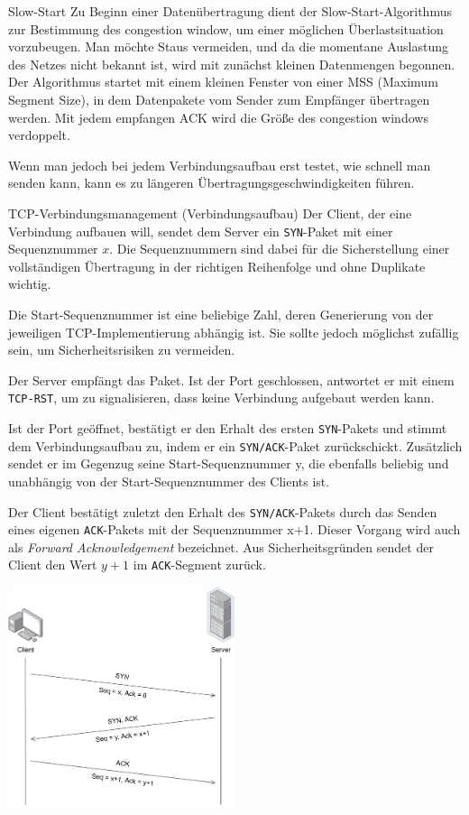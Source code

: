 \begin{bonus}{Slow-Start}
    Zu Beginn einer Datenübertragung dient der Slow-Start-Algorithmus zur Bestimmung des congestion window, um einer möglichen Überlastsituation vorzubeugen.
    Man möchte Staus vermeiden, und da die momentane Auslastung des Netzes nicht bekannt ist, wird mit zunächst kleinen Datenmengen begonnen. Der Algorithmus startet mit einem kleinen Fenster von einer MSS (Maximum Segment Size), in dem Datenpakete vom Sender zum Empfänger übertragen werden.
    Mit jedem empfangen ACK wird die Größe des congestion windows verdoppelt.

    Wenn man jedoch bei jedem Verbindungsaufbau erst testet, wie schnell man senden kann, kann es zu längeren Übertragungsgeschwindigkeiten führen.
\end{bonus}

\begin{defi}{TCP-Verbindungsmanagement (Verbindungsaufbau)}
    Der Client, der eine Verbindung aufbauen will, sendet dem Server ein \texttt{SYN}-Paket mit einer Sequenznummer $x$.
    Die Sequenznummern sind dabei für die Sicherstellung einer vollständigen Übertragung in der richtigen Reihenfolge und ohne Duplikate wichtig.

    Die Start-Sequenznummer ist eine beliebige Zahl, deren Generierung von der jeweiligen TCP-Implementierung abhängig ist.
    Sie sollte jedoch möglichst zufällig sein, um Sicherheitsrisiken zu vermeiden.

    Der Server empfängt das Paket. Ist der Port geschlossen, antwortet er mit einem \texttt{TCP-RST}, um zu signalisieren, dass keine Verbindung aufgebaut werden kann.

    Ist der Port geöffnet, bestätigt er den Erhalt des ersten \texttt{SYN}-Pakets und stimmt dem Verbindungsaufbau zu, indem er ein \texttt{SYN/ACK}-Paket zurückschickt.
    Zusätzlich sendet er im Gegenzug seine Start-Sequenznummer y, die ebenfalls beliebig und unabhängig von der Start-Sequenznummer des Clients ist.

    Der Client bestätigt zuletzt den Erhalt des \texttt{SYN/ACK}-Pakets durch das Senden eines eigenen \texttt{ACK}-Pakets mit der Sequenznummer x+1. Dieser Vorgang wird auch als \emph{Forward Acknowledgement} bezeichnet.
    Aus Sicherheitsgründen sendet der Client den Wert $y+1$ im \texttt{ACK}-Segment zurück.

    \centering
    \includegraphics[width=0.5\textwidth]{includes/figures/defi_tcp_verbindungsaufbau.pdf}
\end{defi}


